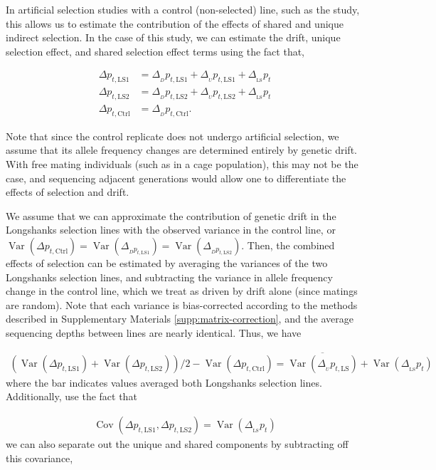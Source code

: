 \documentclass[11pt]{article}
\DeclareMathOperator{\var}{Var}
\DeclareMathOperator{\cov}{Cov}
\begin{document}
{In artificial selection studies with a control (non-selected) line, such as the
\textcite{Castro2019-uk} study, this allows us to estimate the contribution of
the effects of shared and unique indirect selection. In the case of this study,
we can estimate the drift, unique selection effect, and shared selection effect
terms using the fact that,

\begin{align}
  \Delta p_{t,\mathrm{LS1}} &= \Delta_{_D} p_{t,\mathrm{LS1}} + \Delta_{_{U}} p_{t,\mathrm{LS1}} + \Delta_{_\mathrm{LS}} p_t \\ 
  \Delta p_{t,\mathrm{LS2}} &= \Delta_{_D} p_{t,\mathrm{LS2}} + \Delta_{_{U}} p_{t,\mathrm{LS2}} + \Delta_{_\mathrm{LS}} p_t \\ 
  \Delta p_{t,\mathrm{Ctrl}} &= \Delta_{_D} p_{t,\mathrm{Ctrl}}.
\end{align}

Note that since the control replicate does not undergo artificial selection, we
assume that its allele frequency changes are determined entirely by genetic
drift. With free mating individuals (such as in a cage population), this may
not be the case, and sequencing adjacent generations would allow one to
differentiate the effects of selection and drift.

We assume that we can approximate the contribution of genetic drift in the
Longshanks selection lines with the observed variance in the control line, or
$\var(\Delta p_{t,\mathrm{Ctrl}}) = \var(\Delta_{_{D} p_{t,\mathrm{LS1}}}) =
\var(\Delta_{_{D} p_{t,\mathrm{LS2}}})$. Then, the combined effects of
selection can be estimated by averaging the variances of the two Longshanks
selection lines, and subtracting the variance in allele frequency change in the
control line, which we treat as driven by drift alone (since matings are
random). Note that each variance is bias-corrected according to the methods
described in Supplementary Materials \ref{supp:matrix-correction}, and the
average sequencing depths between lines are nearly identical. Thus, we have

\begin{align}
  (\var(\Delta p_{t,\mathrm{LS1}}) + \var(\Delta p_{t,\mathrm{LS2}}))/2 - \var(\Delta p_{t,\mathrm{Ctrl}}) = 
  \overline{\var(\Delta_{_U} p_{t,\mathrm{LS}})} + \var(\Delta_{_\mathrm{LS}} p_t)
\end{align}
%
where the bar indicates values averaged both Longshanks selection lines.
Additionally, use the fact that

\begin{align}
  \cov(\Delta p_{t,\mathrm{LS1}}, \Delta p_{t,\mathrm{LS2}}) = \var(\Delta_{_\mathrm{LS}} p_t)
\end{align}
%
we can also separate out the unique and shared components by subtracting off
this covariance,

}
\end{document}
